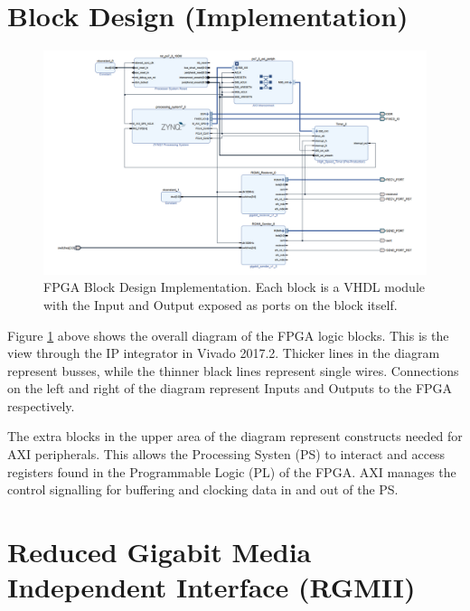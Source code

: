 \section{Block Design (Implementation)}

\begin{figure}[H]
    \begin{center}
        \includegraphics[keepaspectratio,width=15cm]{Images/BlockDesignImpl}
        \caption{FPGA Block Design Implementation. Each block is a VHDL module with the Input and Output exposed as 
        ports on the block itself.}
        \label{fig:blockdesignimpl}
    \end{center}
\end{figure}

\par Figure \ref{fig:blockdesignimpl} above shows the overall diagram of the FPGA logic blocks. This is the view 
through the IP integrator in Vivado 2017.2. Thicker lines in the diagram represent busses, while the thinner black 
lines represent single wires.  Connections on the left and right of the diagram represent Inputs and Outputs to the 
FPGA respectively. 

\par The extra blocks in the upper area of the diagram represent constructs needed for AXI peripherals. This allows 
the Processing Systen (PS) to interact and access registers found in the Programmable Logic (PL) of the FPGA. AXI manages the control signalling for buffering 
and clocking data in and out of the PS.

\section{Reduced Gigabit Media Independent Interface (RGMII)}

